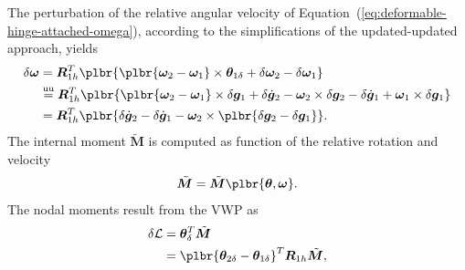 \documentclass[10pt,fleqn,subeqn]{report}
\newcommand{\T}[1]{\bm{#1}}
\newcommand{\TT}[1]{\bm{#1}}
\newcommand{\equu}{\overset{\text{uu}}{=}}
\begin{document}

The perturbation of the relative angular velocity
of Equation~(\ref{eq:deformable-hinge-attached-omega}),
according to the simplifications of the updated-updated approach, yields
\begin{align}
	\delta\T{\omega} &= \T{R}_{1h}^T\plbr{
		\plbr{\T{\omega}_2 - \T{\omega}_1} \times \T{\theta}_{1\delta}
		+ \delta\T{\omega}_2
		- \delta\T{\omega}_1
	} \nonumber \\
	&\equu \T{R}_{1h}^T\plbr{
		\plbr{\T{\omega}_2 - \T{\omega}_1} \times \delta\T{g}_1
		+ \delta\dot{\T{g}}_2 - \T{\omega}_2 \times \delta\T{g}_2
		- \delta\dot{\T{g}}_1 + \T{\omega}_1 \times \delta\T{g}_1
	} \nonumber \\
	&= \T{R}_{1h}^T\plbr{
		\delta\dot{\T{g}}_2
		- \delta\dot{\T{g}}_1
		- \T{\omega}_2 \times \plbr{\delta\T{g}_2 - \delta\T{g}_1}
	} .
\end{align}
The internal moment $\tilde{\T{M}}$ is computed as function
of the relative rotation and velocity
\begin{equation}
	\tilde{\T{M}} = \tilde{\T{M}}\plbr{\T{\theta}, \T{\omega}} .
\end{equation}
The nodal moments result from the VWP as
\begin{align}
	\delta\mathcal{L} &= \T{\theta}_{\delta}^T \tilde{\T{M}} \nonumber \\
	&= \plbr{
		\T{\theta}_{2\delta} - \T{\theta}_{1\delta}
	}^T \T{R}_{1h} \tilde{\T{M}} ,
\end{align}
\end{document}
